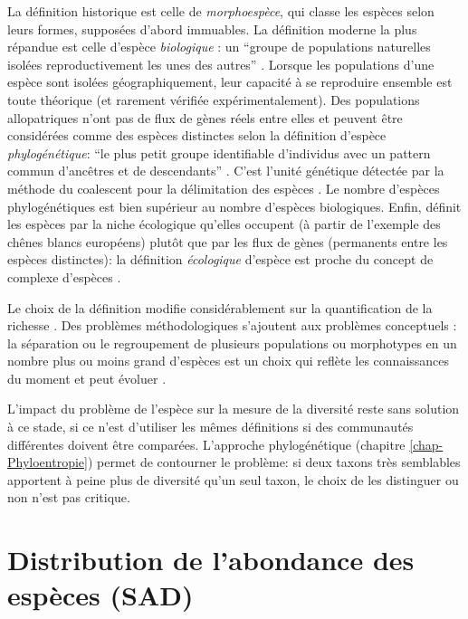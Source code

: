 \documentclass[
  11pt,
  american,
  a4paper,
  extrafontsizes,onecolumn,openright
  ]{memoir}
\begin{document}
La définition historique est celle de \emph{morphoespèce}, qui classe les espèces selon leurs formes, supposées d'abord immuables.
La définition moderne la plus répandue est celle d'espèce \emph{biologique} \autocite{Dobzhansky1937}: un \enquote{groupe de populations naturelles isolées reproductivement les unes des autres} \autocite{Mayr1942}.
Lorsque les populations d'une espèce sont isolées géographiquement, leur capacité à se reproduire ensemble est toute théorique (et rarement vérifiée expérimentalement).
Des populations allopatriques n'ont pas de flux de gènes réels entre elles et peuvent être considérées comme des espèces distinctes selon la définition d'espèce \emph{phylogénétique}: \enquote{le plus petit groupe identifiable d'individus avec un pattern commun d'ancêtres et de descendants} \autocite{Cracraft1983}.
C'est l'unité génétique détectée par la méthode du coalescent pour la délimitation des espèces \autocite{Sukumaran2017}.
Le nombre d'espèces phylogénétiques est bien supérieur au nombre d'espèces biologiques.
Enfin, \textcite{VanValen1976} définit les espèces par la niche écologique qu'elles occupent (à partir de l'exemple des chênes blancs européens) plutôt que par les flux de gènes (permanents entre les espèces distinctes): la définition \emph{écologique} d'espèce est proche du concept de complexe d'espèces \autocite[ensemble d'espèces voisines échangeant des gènes,][]{Pernes1984}.

Le choix de la définition modifie considérablement sur la quantification de la richesse \autocite{Agapow2004}.
Des problèmes méthodologiques s'ajoutent aux problèmes conceptuels \autocite{Hey2001}: la séparation ou le regroupement de plusieurs populations ou morphotypes en un nombre plus ou moins grand d'espèces est un choix qui reflète les connaissances du moment et peut évoluer \autocite{Barberousse2014}.

L'impact du problème de l'espèce sur la mesure de la diversité reste sans solution à ce stade, si ce n'est d'utiliser les mêmes définitions si des communautés différentes doivent être comparées.
L'approche phylogénétique (chapitre \ref{chap-Phyloentropie}) permet de contourner le problème: si deux taxons très semblables apportent à peine plus de diversité qu'un seul taxon, le choix de les distinguer ou non n'est pas critique.

\hypertarget{sec-SAD}{%
\chapter{Distribution de l'abondance des espèces (SAD)}\label{sec-SAD}}
\end{document}

